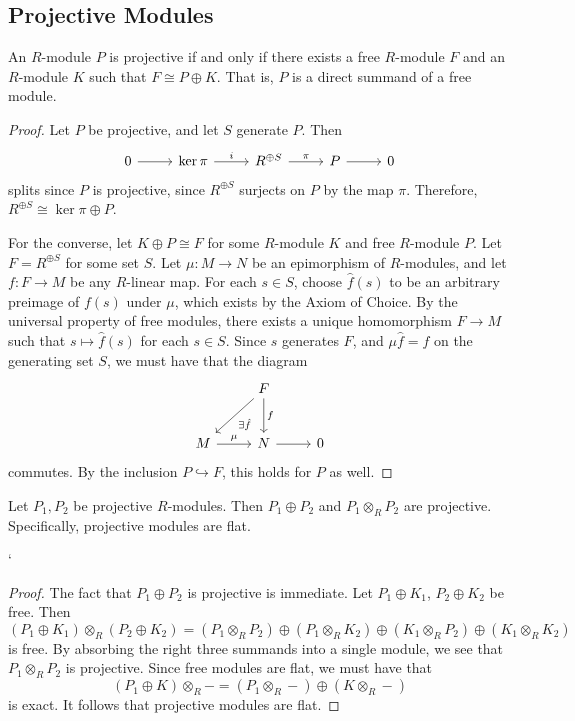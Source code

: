 \subsection{Projective Modules}
\begin{proposition}\label{prp:8.9}
	An $R$-module $P$ is projective if and only if there exists a free $R$-module $F$ and an $R$-module $K$ such that $F\cong P\oplus K$. That is, $P$ is a direct summand of a free module.
\end{proposition}
\begin{proof}
	Let $P$ be projective, and let $S$ generate $P$. Then
	\[\begin{tikzcd}[row sep = 2.5em, column sep = 2.5em]
		0\arrow[r]&\ker \pi \arrow[r, "i"]&R^{\oplus S} \arrow[r, "\pi "]&P\arrow[r]&0
	\end{tikzcd}\]
	splits since $P$ is projective, since $R^{\oplus S} $ surjects on $P$ by the map $\pi $. Therefore, $R^{\oplus S} \cong \ker \pi \oplus P$.

	For the converse, let $K\oplus P \cong F$ for some $R$-module $K$ and free $R$-module $P$. Let $F=R^{\oplus S} $ for some set $S$. Let $\mu : M \to N$ be an epimorphism of $R$-modules, and let $f : F \to M$ be any $R$-linear map. For each $s\in S$, choose $\hat{f} (s)$ to be an arbitrary preimage of $f(s)$ under $\mu $, which exists by the Axiom of Choice. By the universal property of free modules, there exists a unique homomorphism $F\to M$ such that $s\mapsto \hat{f} (s)$ for each $s\in S$. Since $s$ generates $F$, and $\mu \hat{f} =f$ on the generating set $S$, we must have that the diagram
	\[\begin{tikzcd}[row sep = 2.5em, column sep = 2.5em]
		&F\arrow[dl, "\exists \hat{f} "]\arrow[d, "f"]\\
		M\arrow[r, "\mu "]&N\arrow[r]&0
	\end{tikzcd}\]
	commutes. By the inclusion $P\hookrightarrow F$, this holds for $P$ as well.
\end{proof}
\begin{corollary}\label{cor:8.7}
	Let $P_1,P_2$ be projective $R$-modules. Then $P_1\oplus P_2$ and $P_1\otimes _RP_2$ are projective. Specifically, projective modules are flat.
\end{corollary}`
\begin{proof}
	The fact that $P_1\oplus P_2$ is projective is immediate. Let $P_1\oplus K_1$, $P_2\oplus K_2$ be free. Then
	\[
		\left( P_1\oplus K_1 \right) \otimes _R\left( P_2\oplus K_2 \right) =\left( P_1\otimes_R P_2 \right) \oplus \left( P_1 \otimes _RK_2 \right) \oplus \left( K_1\otimes _RP_2 \right) \oplus \left( K_1\otimes _RK_2 \right) 
	\]
	is free. By absorbing the right three summands into a single module, we see that $P_1\otimes _RP_2$ is projective. Since free modules are flat, we must have that
	\[
		\left( P_1 \oplus K \right) \otimes_R -=(P_1 \otimes _R -)\oplus (K\otimes _R-)
	\]
	is exact. It follows that projective modules are flat.
\end{proof}

